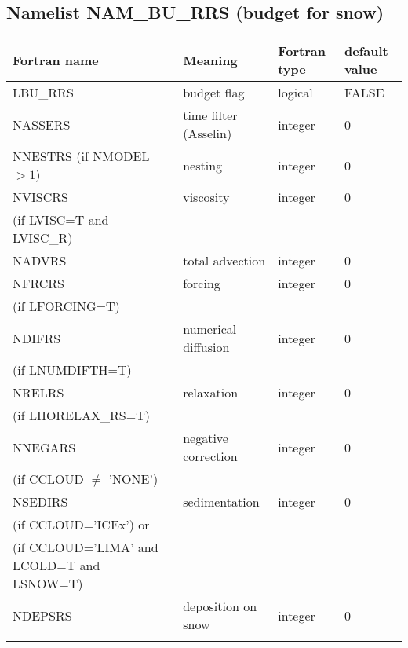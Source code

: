 \subsection{Namelist NAM\_BU\_RRS (budget for snow)}

\begin{longtable} {|p{}|p{}|>{\centering}p{}|p{}<{\centering}|}
\hline
Fortran name & Meaning & Fortran type & default value \\
\hline \hline
\endhead
LBU\_RRS & budget flag & logical & FALSE\index{LBU\_RRS!\innam{NAM\_BU\_RRS}} \\\hline
NASSERS  & time filter (Asselin)   & integer  &  0 \index{NASSERS!\innam{NAM\_BU\_RRS}} \\\hline
NNESTRS (if NMODEL$>1$) & nesting           & integer  &  0 \index{NNESTRS!\innam{NAM\_BU\_RRS}} \\\hline
NVISCRS  & viscosity         & integer  &  0 \index{NVISCRS!\innam{NAM\_BU\_RRS}}\\
(if LVISC=T and LVISC\_R) &  &   &   \\\hline
NADVRS   & total advection   & integer  &  0 \index{NADVRS!\innam{NAM\_BU\_RRS}}\\\hline
NFRCRS   & forcing           & integer  &  0 \index{NFRCRS!\innam{NAM\_BU\_RRS}} \\ \nopagebreak
(if LFORCING=T) &  &   &   \\\hline
NDIFRS   & numerical diffusion & integer  &  0 \index{NDIFRS!\innam{NAM\_BU\_RRS}} \\ \nopagebreak
(if LNUMDIFTH=T) &  &   &   \\\hline
NRELRS   & relaxation        & integer  &  0 \index{NRELRS!\innam{NAM\_BU\_RRS}}\\ \nopagebreak
(if LHORELAX\_RS=T) &  &   &   \\\hline
NNEGARS  & negative correction & integer  &  0 \index{NNEGARS!\innam{NAM\_BU\_RRS}}\\ \nopagebreak
(if CCLOUD $\neq$ 'NONE') & &   &  \\\hline
NSEDIRS  & sedimentation & integer  &  0 \index{NSEDIRS!\innam{NAM\_BU\_RRS}}\\ \nopagebreak
(if CCLOUD='ICEx') or & &   &  \\ \nopagebreak
(if CCLOUD='LIMA' and LCOLD=T and LSNOW=T) & &   &  \\\hline
NDEPSRS  & deposition on snow & integer  &  0 \index{NDEPSRS!\innam{NAM\_BU\_RRS}}\\ \nopagebreak

\end{longtable}

